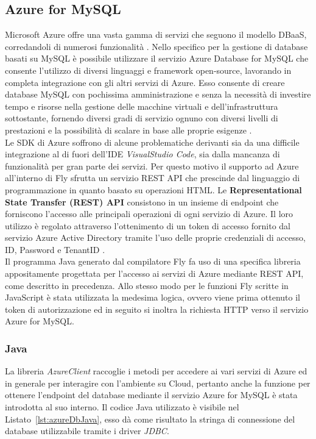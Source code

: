 \subsection{Azure for MySQL}
Microsoft Azure offre una vasta gamma di servizi che seguono il modello DBaaS, corredandoli di numerosi funzionalità \cite{AzureDB}. Nello specifico per la gestione di database basati su MySQL è possibile utilizzare il servizio Azure Database for MySQL che consente l’utilizzo di diversi linguaggi e framework open-source, lavorando in completa integrazione con gli altri servizi di Azure. Esso consente di creare database MySQL con pochissima amministrazione e senza la necessità di investire tempo e risorse nella gestione delle macchine virtuali e dell'infrastruttura sottostante, fornendo diversi gradi di servizio ognuno con diversi livelli di prestazioni e la possibilità di scalare in base alle proprie esigenze \cite{AzureMySQL}. \\
Le SDK di Azure soffrono di alcune problematiche derivanti sia da una difficile integrazione al di fuori dell’IDE \textit{VisualStudio Code}, sia dalla mancanza di funzionalità per gran parte dei servizi. Per questo motivo il supporto ad Azure all'interno di Fly sfrutta un servizio REST API che prescinde dal linguaggio di programmazione in quanto basato su operazioni HTML. Le \textbf{Representational State Transfer (REST) API} consistono in un insieme di endpoint che forniscono l'accesso alle principali operazioni di ogni servizio di Azure. Il loro utilizzo è regolato attraverso l'ottenimento di un token di accesso fornito dal servizio Azure Active Directory tramite l'uso delle proprie credenziali di accesso, ID, Password e TenantID \cite{azureAD}. \\
Il programma Java generato dal compilatore Fly fa uso di una specifica libreria appositamente progettata per l'accesso ai servizi di Azure mediante REST API, come descritto in precedenza. Allo stesso modo per le funzioni Fly scritte in JavaScript è stata utilizzata la medesima logica, ovvero viene prima ottenuto il token di autorizzazione ed in seguito si inoltra la richiesta HTTP verso il servizio Azure for MySQL.\\

\subsubsection{Java}
La libreria \textit{AzureClient} raccoglie i metodi per accedere ai vari servizi di Azure ed in generale per interagire con l'ambiente su Cloud, pertanto anche la funzione per ottenere l'endpoint del database mediante il servizio Azure for MySQL è stata introdotta al suo interno. Il codice Java utilizzato è visibile nel Listato~\ref{lst:azureDbJava}, esso dà come risultato la stringa di connessione del database utilizzabile tramite i driver \textit{JDBC}.\\
\newpage

